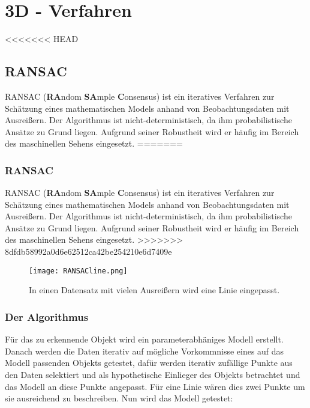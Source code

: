 
\chapter{3D - Verfahren}
\label{chap:3d}
<<<<<<< HEAD
\section{RANSAC}
RANSAC (\textbf{RA}ndom \textbf{SA}mple \textbf{C}onsensus) ist ein iteratives Verfahren zur Schätzung eines mathematischen Models anhand von Beobachtungsdaten mit Ausreißern. Der Algorithmus ist nicht-deterministisch, da ihm probabilistische Ansätze zu Grund liegen. Aufgrund seiner Robustheit wird er häufig im Bereich des maschinellen Sehens eingesetzt. 
=======
\subsection{RANSAC}
RANSAC (\textbf{RA}ndom \textbf{SA}mple \textbf{C}onsensus) \cite{Fischler1981} ist ein iteratives Verfahren zur Schätzung eines mathematischen Models anhand von Beobachtungsdaten mit Ausreißern. Der Algorithmus ist nicht-deterministisch, da ihm probabilistische Ansätze zu Grund liegen. Aufgrund seiner Robustheit wird er häufig im Bereich des maschinellen Sehens eingesetzt. 
>>>>>>> 8dfdb58992a0d6e62512ca42be254210e6d7409e

\begin{figure}[H]
  \begin{center}
    \texttt{[image: RANSACline.png]}
    \caption{In einen Datensatz mit vielen Ausreißern wird eine Linie eingepasst.}
    \label{fig:ransac1}
  \end{center}
\end{figure}

\subsection{Der Algorithmus}
 Für das zu erkennende Objekt wird ein parameterabhäniges Modell erstellt. Danach werden die Daten iterativ auf mögliche Vorkommnisse eines auf das Modell passenden Objekts getestet, dafür werden iterativ zufällige Punkte aus den Daten selektiert und als hypothetische Einlieger des Objekts betrachtet und das Modell an diese Punkte angepasst. Für eine Linie wären dies zwei Punkte um sie ausreichend zu beschreiben. Nun wird das Modell getestet:

